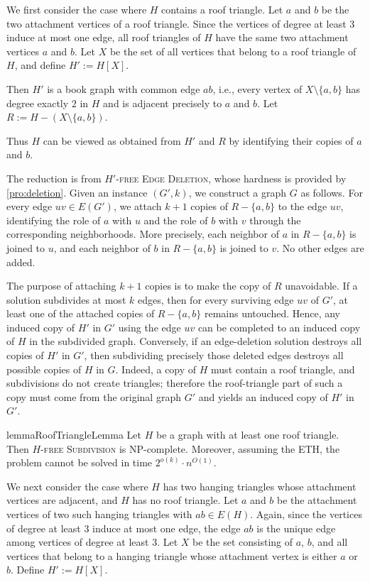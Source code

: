 \documentclass[a4paper,UKenglish,cleveref, autoref, thm-restate]{lipics-v2021}
\begin{document}
We first consider the case where $H$ contains a roof triangle.
Let $a$ and $b$ be the two attachment vertices of a roof triangle.
Since the vertices of degree at least $3$ induce at most one edge, all roof triangles of $H$ have the same two attachment vertices $a$ and $b$.
Let $X$ be the set of all vertices that belong to a roof triangle of $H$, and define
$H' := H[X]$.

Then $H'$ is a book graph with common edge $ab$, i.e., every vertex of $X\setminus\{a,b\}$ has degree exactly $2$ in $H$ and is adjacent precisely to $a$ and $b$.
Let $R := H-(X\setminus\{a,b\})$.

Thus $H$ can be viewed as obtained from $H'$ and $R$ by identifying their copies of $a$ and $b$.

The reduction is from \textsc{$H'$-free Edge Deletion}, whose hardness is provided by \cref{pro:deletion}. 
Given an instance $(G',k)$, we construct a graph $G$ as follows.
For every edge $uv\in E(G')$, we attach $k+1$ copies of $R-\{a,b\}$ to the edge $uv$, identifying the role of $a$ with $u$ and the role of $b$ with $v$ through the corresponding neighborhoods.
More precisely, each neighbor of $a$ in $R-\{a,b\}$ is joined to $u$, and each neighbor of $b$ in $R-\{a,b\}$ is joined to $v$.
No other edges are added.

The purpose of attaching $k+1$ copies is to make the copy of $R$ unavoidable.
If a solution subdivides at most $k$ edges, then for every surviving edge $uv$ of $G'$, at least one of the attached copies of $R-\{a,b\}$ remains untouched.
Hence, any induced copy of $H'$ in $G'$ using the edge $uv$ can be completed to an induced copy of $H$ in the subdivided graph.
Conversely, if an edge-deletion solution destroys all copies of $H'$ in $G'$, then subdividing precisely those deleted edges destroys all possible copies of $H$ in $G$.
Indeed, a copy of $H$ must contain a roof triangle, and subdivisions do not create triangles; therefore the roof-triangle part of such a copy must come from the original graph $G'$ and yields an induced copy of $H'$ in $G'$.

\begin{restatable}{lemma}{RoofTriangleLemma}
\label{lem:roof-triangle}
Let $H$ be a graph with at least one roof triangle.
Then \textsc{$H$-free Subdivision} is NP-complete.
Moreover, assuming the ETH, the problem cannot be solved in time
$2^{o(k)}\cdot n^{O(1)}$.
\end{restatable}

We next consider the case where $H$ has two hanging triangles whose attachment vertices are adjacent, and $H$ has no roof triangle.
Let $a$ and $b$ be the attachment vertices of two such hanging triangles with $ab\in E(H)$.
Again, since the vertices of degree at least $3$ induce at most one edge, the edge $ab$ is the unique edge among vertices of degree at least $3$.
Let $X$ be the set consisting of $a$, $b$, and all vertices that belong to a hanging triangle whose attachment vertex is either $a$ or $b$.
Define
$ H' := H[X]$.
\end{document}
